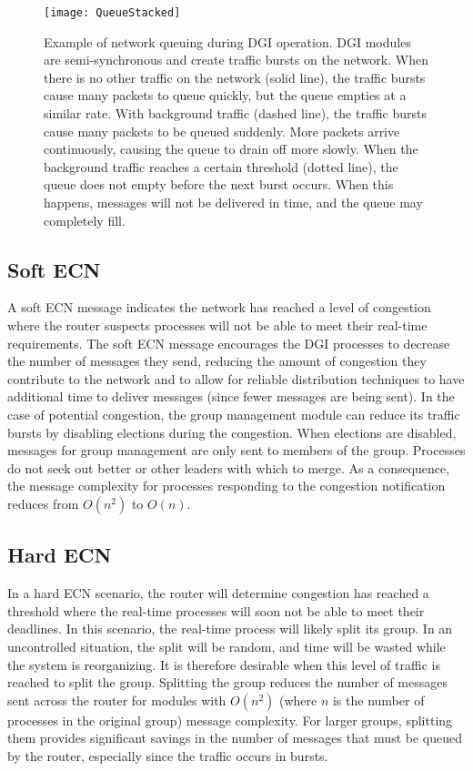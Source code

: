 \begin{figure}[htbp]
\centering
\texttt{[image: QueueStacked]}
\caption[
Example of network queuing during \ac{DGI} operation.
]{
Example of network queuing during \ac{DGI} operation.
\ac{DGI} modules are semi-synchronous and create traffic bursts on the network.
When there is no other traffic on the network (solid line), the traffic bursts cause many packets to queue quickly, but the queue empties at a similar rate.
With background traffic (dashed line), the traffic bursts cause many packets to be queued suddenly. More packets arrive continuously, causing the queue to drain off more slowly.
When the background traffic reaches a certain threshold (dotted line), the queue does not empty before the next burst occurs. When this happens, messages will not be delivered in time, and the queue may completely fill.
}
\label{fig:queue-types}
\end{figure}

\subsection{Soft \ac{ECN}}

A soft \ac{ECN} message indicates the network has reached a level of congestion where the router suspects processes will not be able to meet their real-time requirements.
The soft \ac{ECN} message encourages the \ac{DGI} processes to decrease the number of messages they send, reducing the amount of congestion they contribute to the network and to allow for reliable distribution techniques to have additional time to deliver messages (since fewer messages are being sent).
In the case of potential congestion, the group management module can reduce its traffic bursts by disabling elections during the congestion.
When elections are disabled, messages for group management are only sent to members of the group.
Processes do not seek out better or other leaders with which to merge.
As a consequence, the message complexity for processes responding to the congestion notification reduces from $O(n^2)$ to $O(n)$.

\subsection{Hard \ac{ECN}}

In a hard \ac{ECN} scenario, the router will determine congestion has reached a threshold where the real-time processes will soon not be able to meet their deadlines.
In this scenario, the real-time process will likely split its group.
In an uncontrolled situation, the split will be random, and time will be wasted while the system is reorganizing.
It is therefore desirable when this level of traffic is reached to split the group.
Splitting the group reduces the number of messages sent across the router for modules with $O(n^2)$ (where $n$ is the number of processes in the original group) message complexity.
For larger groups, splitting them provides significant savings in the number of messages that must be queued by the router, especially since the traffic occurs in bursts.


